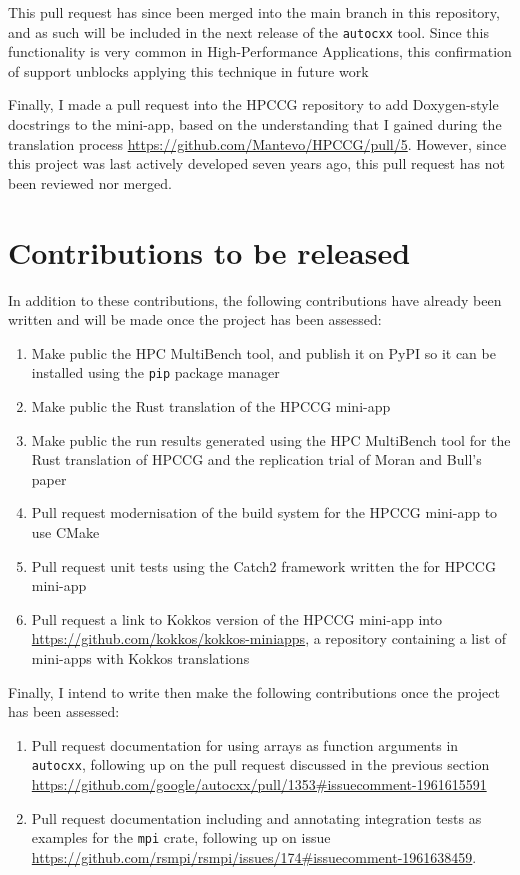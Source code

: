 This pull request has since been merged into the main branch in this repository, and as such will be included in the next release of the \texttt{autocxx} tool. Since this functionality is very common in High-Performance Applications, this confirmation of support unblocks applying this technique in future work

Finally, I made a pull request into the HPCCG repository to add Doxygen-style docstrings to the mini-app, based on the understanding that I gained during the translation process \url{https://github.com/Mantevo/HPCCG/pull/5}. However, since this project was last actively developed seven years ago, this pull request has not been reviewed nor merged.

\section{Contributions to be released}
\label{sec:open-source-to-be-released}

In addition to these contributions, the following contributions have already been written and will be made once the project has been assessed:

\begin{enumerate}
    \item Make public the HPC MultiBench tool, and publish it on PyPI so it can be installed using the \texttt{pip} package manager
    \item Make public the Rust translation of the HPCCG mini-app
    \item Make public the run results generated using the HPC MultiBench tool for the Rust translation of HPCCG and the replication trial of Moran and Bull's paper \cite{moranEmergingTechnologiesRust2023}
    \item Pull request modernisation of the build system for the HPCCG mini-app to use CMake
    \item Pull request unit tests using the Catch2 framework written the for HPCCG mini-app
    \item Pull request a link to Kokkos version of the HPCCG mini-app into \url{https://github.com/kokkos/kokkos-miniapps}, a repository containing a list of mini-apps with Kokkos translations
\end{enumerate}

Finally, I intend to write then make the following contributions once the project has been assessed:

\begin{enumerate}
    \item Pull request documentation for using arrays as function arguments in \texttt{autocxx}, following up on the pull request discussed in the previous section \url{https://github.com/google/autocxx/pull/1353#issuecomment-1961615591}
    \item Pull request documentation including and annotating integration tests as examples for the \texttt{mpi} crate, following up on issue \url{https://github.com/rsmpi/rsmpi/issues/174#issuecomment-1961638459}.
\end{enumerate}
